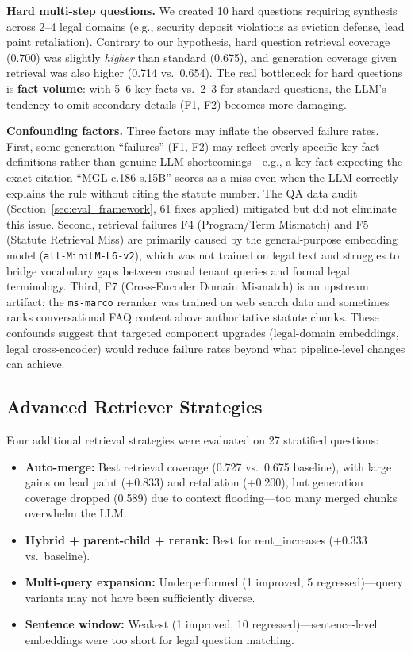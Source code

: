 \documentclass{article}
\begin{document}
\textbf{Hard multi-step questions.} We created 10 hard questions requiring synthesis across 2--4 legal domains (e.g., security deposit violations as eviction defense, lead paint retaliation). Contrary to our hypothesis, hard question retrieval coverage (0.700) was slightly \emph{higher} than standard (0.675), and generation coverage given retrieval was also higher (0.714 vs.\ 0.654). The real bottleneck for hard questions is \textbf{fact volume}: with 5--6 key facts vs.\ 2--3 for standard questions, the LLM's tendency to omit secondary details (F1, F2) becomes more damaging.

\textbf{Confounding factors.} Three factors may inflate the observed failure rates. First, some generation ``failures'' (F1, F2) may reflect overly specific key-fact definitions rather than genuine LLM shortcomings---e.g., a key fact expecting the exact citation ``MGL c.186 s.15B'' scores as a miss even when the LLM correctly explains the rule without citing the statute number. The QA data audit (Section~\ref{sec:eval_framework}, 61 fixes applied) mitigated but did not eliminate this issue. Second, retrieval failures F4 (Program/Term Mismatch) and F5 (Statute Retrieval Miss) are primarily caused by the general-purpose embedding model (\texttt{all-MiniLM-L6-v2}), which was not trained on legal text and struggles to bridge vocabulary gaps between casual tenant queries and formal legal terminology. Third, F7 (Cross-Encoder Domain Mismatch) is an upstream artifact: the \texttt{ms-marco} reranker was trained on web search data and sometimes ranks conversational FAQ content above authoritative statute chunks. These confounds suggest that targeted component upgrades (legal-domain embeddings, legal cross-encoder) would reduce failure rates beyond what pipeline-level changes can achieve.

\subsection{Advanced Retriever Strategies}
\label{sec:advanced_retrievers}

Four additional retrieval strategies were evaluated on 27 stratified questions:

\begin{itemize}
    \item \textbf{Auto-merge:} Best retrieval coverage (0.727 vs.\ 0.675 baseline), with large gains on lead paint (+0.833) and retaliation (+0.200), but generation coverage dropped (0.589) due to context flooding---too many merged chunks overwhelm the LLM.
    \item \textbf{Hybrid + parent-child + rerank:} Best for rent\_increases (+0.333 vs.\ baseline).
    \item \textbf{Multi-query expansion:} Underperformed (1 improved, 5 regressed)---query variants may not have been sufficiently diverse.
    \item \textbf{Sentence window:} Weakest (1 improved, 10 regressed)---sentence-level embeddings were too short for legal question matching.
\end{itemize}
\end{document}
